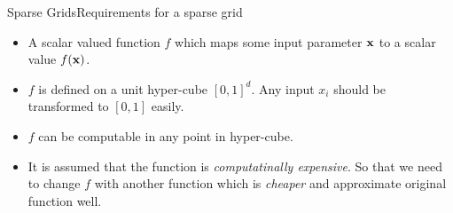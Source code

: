 \begin{frame}{Sparse Grids}{Requirements for a sparse grid}
    \begin{itemize}[<+->]
        \item A scalar valued function \(f\) which maps some input parameter \(\vb{x}\) to a scalar value \(f(\vb{x})\).
        \item \(f\) is defined on a unit hyper-cube \([0,1]^d\). Any input \(x_i\) should be transformed to \([0,1]\) easily.
        \item \(f\) can be computable in any point in hyper-cube.
        \item It is assumed that the function is \emph{computatinally expensive}. So that we need to change \(f\) with another function which is \emph{cheaper} and approximate original function well.
    \end{itemize}
\end{frame}

